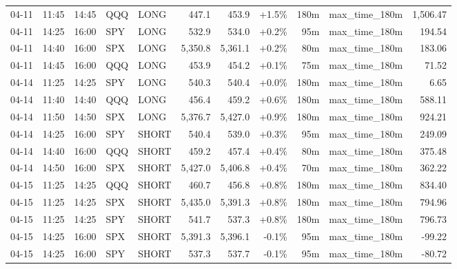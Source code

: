 \documentclass[11pt,a4paper,twoside]{article}
\begin{document}
\begin{center}
\begin{longtable}{>{\color{txtmain}}l l l l l r r r r >{\color{txtmain}}l r}
04-11 & 11:45 & 14:45 & QQQ & LONG & 447.1 & 453.9 & \textcolor{wingreen}{+1.5\%} & 180m & max\_time\_180m & \textcolor{wingreen}{1,506.47} \\
04-11 & 14:25 & 16:00 & SPY & LONG & 532.9 & 534.0 & \textcolor{wingreen}{+0.2\%} & 95m & max\_time\_180m & \textcolor{wingreen}{194.54} \\
04-11 & 14:40 & 16:00 & SPX & LONG & 5,350.8 & 5,361.1 & \textcolor{wingreen}{+0.2\%} & 80m & max\_time\_180m & \textcolor{wingreen}{183.06} \\
04-11 & 14:45 & 16:00 & QQQ & LONG & 453.9 & 454.2 & \textcolor{wingreen}{+0.1\%} & 75m & max\_time\_180m & \textcolor{wingreen}{71.52} \\
04-14 & 11:25 & 14:25 & SPY & LONG & 540.3 & 540.4 & \textcolor{wingreen}{+0.0\%} & 180m & max\_time\_180m & \textcolor{wingreen}{6.65} \\
04-14 & 11:40 & 14:40 & QQQ & LONG & 456.4 & 459.2 & \textcolor{wingreen}{+0.6\%} & 180m & max\_time\_180m & \textcolor{wingreen}{588.11} \\
04-14 & 11:50 & 14:50 & SPX & LONG & 5,376.7 & 5,427.0 & \textcolor{wingreen}{+0.9\%} & 180m & max\_time\_180m & \textcolor{wingreen}{924.21} \\
04-14 & 14:25 & 16:00 & SPY & SHORT & 540.4 & 539.0 & \textcolor{wingreen}{+0.3\%} & 95m & max\_time\_180m & \textcolor{wingreen}{249.09} \\
04-14 & 14:40 & 16:00 & QQQ & SHORT & 459.2 & 457.4 & \textcolor{wingreen}{+0.4\%} & 80m & max\_time\_180m & \textcolor{wingreen}{375.48} \\
04-14 & 14:50 & 16:00 & SPX & SHORT & 5,427.0 & 5,406.8 & \textcolor{wingreen}{+0.4\%} & 70m & max\_time\_180m & \textcolor{wingreen}{362.22} \\
04-15 & 11:25 & 14:25 & QQQ & SHORT & 460.7 & 456.8 & \textcolor{wingreen}{+0.8\%} & 180m & max\_time\_180m & \textcolor{wingreen}{834.40} \\
04-15 & 11:25 & 14:25 & SPX & SHORT & 5,435.0 & 5,391.3 & \textcolor{wingreen}{+0.8\%} & 180m & max\_time\_180m & \textcolor{wingreen}{794.96} \\
04-15 & 11:25 & 14:25 & SPY & SHORT & 541.7 & 537.3 & \textcolor{wingreen}{+0.8\%} & 180m & max\_time\_180m & \textcolor{wingreen}{796.73} \\
04-15 & 14:25 & 16:00 & SPX & SHORT & 5,391.3 & 5,396.1 & \textcolor{lossred}{-0.1\%} & 95m & max\_time\_180m & \textcolor{lossred}{-99.22} \\
04-15 & 14:25 & 16:00 & SPY & SHORT & 537.3 & 537.7 & \textcolor{lossred}{-0.1\%} & 95m & max\_time\_180m & \textcolor{lossred}{-80.72} \\

\end{longtable}
\end{center}
\end{document}
